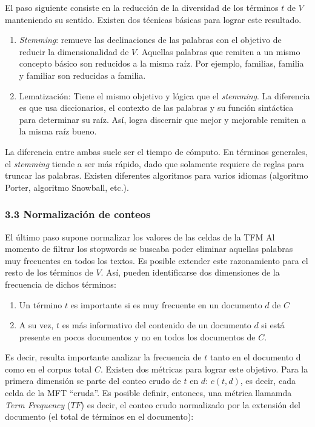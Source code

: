 \documentclass[]{article}
\providecommand{\tightlist}{%
  \setlength{\itemsep}{0pt}\setlength{\parskip}{0pt}}
\begin{document}
El paso siguiente consiste en la reducción de la diversidad de los
términos \(t\) de \(V\) manteniendo su sentido. Existen dos técnicas
básicas para lograr este resultado.

\begin{enumerate}
\def\labelenumi{\arabic{enumi}.}
\tightlist
\item
  \emph{Stemming}: remueve las declinaciones de las palabras con el
  objetivo de reducir la dimensionalidad de \(V\). Aquellas palabras que
  remiten a un mismo concepto básico son reducidos a la misma raíz. Por
  ejemplo, familias, familia y familiar son reducidas a familia.
\item
  Lematización: Tiene el mismo objetivo y lógica que el \emph{stemming}.
  La diferencia es que usa diccionarios, el contexto de las palabras y
  su función sintáctica para determinar su raíz. Así, logra discernir
  que mejor y mejorable remiten a la misma raíz bueno.
\end{enumerate}

La diferencia entre ambas suele ser el tiempo de cómputo. En términos
generales, el \emph{stemming} tiende a ser más rápido, dado que
solamente requiere de reglas para truncar las palabras. Existen
diferentes algoritmos para varios idiomas (algoritmo Porter, algoritmo
Snowball, etc.).

\subsubsection{3.3 Normalización de
conteos}\label{normalizaciuxf3n-de-conteos}

El último paso supone normalizar los valores de las celdas de la TFM Al
momento de filtrar los stopwords se buscaba poder eliminar aquellas
palabras muy frecuentes en todos los textos. Es posible extender este
razonamiento para el resto de los términos de \(V\). Así, pueden
identificarse dos dimensiones de la frecuencia de dichos términos:

\begin{enumerate}
\def\labelenumi{\arabic{enumi}.}
\tightlist
\item
  Un término \(t\) es importante si es muy frecuente en un documento
  \(d\) de \(C\)
\item
  A su vez, \(t\) es más informativo del contenido de un documento \(d\)
  si está presente en pocos documentos y no en todos los documentos de
  \(C\).
\end{enumerate}

Es decir, resulta importante analizar la frecuencia de \(t\) tanto en el
documento d como en el corpus total \(C\). Existen dos métricas para
lograr este objetivo. Para la primera dimensión se parte del conteo
crudo de \(t\) en \(d\): \(c(t, d)\), es decir, cada celda de la MFT
``cruda''. Es posible definir, entonces, una métrica llamamda \emph{Term
Frequency} (\(TF\)) es decir, el conteo crudo normalizado por la
extensión del documento (el total de términos en el documento):
\end{document}
